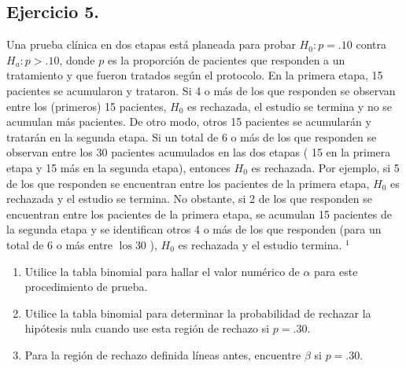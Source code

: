 \documentclass[
]{article}
\providecommand{\tightlist}{%
  \setlength{\itemsep}{0pt}\setlength{\parskip}{0pt}}
\begin{document}
\subsection{Ejercicio 5.}\label{ejercicio-5.}

Una prueba clínica en dos etapas está planeada para probar \(H_{0}: p=.10\) contra \(H_{a}: p>.10\), donde \(p\) es la proporción de pacientes que responden a un tratamiento y que fueron tratados según el protocolo. En la primera etapa, 15 pacientes se acumularon y trataron. Si 4 o más de los que responden se observan entre los (primeros) 15 pacientes, \(H_{0}\) es rechazada, el estudio se termina y no se acumulan más pacientes. De otro modo, otros 15 pacientes se acumularán y tratarán en la segunda etapa. Si un total de 6 o más de los que responden se observan entre los 30 pacientes acumulados en las dos etapas ( 15 en la primera etapa y 15 más en la segunda etapa), entonces \(H_{0}\) es rechazada. Por ejemplo, si 5 de los que responden se encuentran entre los pacientes de la primera etapa, \(H_{0}\) es rechazada y el estudio se termina. No obstante, si 2 de los que responden se encuentran entre los pacientes de la primera etapa, se acumulan 15 pacientes de la segunda etapa y se identifican otros 4 o más de los que responden (para un total de 6 o más entre \(\operatorname{los} 30\) ), \(H_{0}\) es rechazada y el estudio termina. \({ }^{1}\)

\begin{enumerate}
\def\labelenumi{\alph{enumi}.}
\tightlist
\item
  Utilice la tabla binomial para hallar el valor numérico de \(\alpha\) para este procedimiento de prueba.
\item
  Utilice la tabla binomial para determinar la probabilidad de rechazar la hipótesis nula cuando use esta región de rechazo si \(p=.30\).
\item
  Para la región de rechazo definida líneas antes, encuentre \(\beta\) si \(p=.30\).
\end{enumerate}
\end{document}
